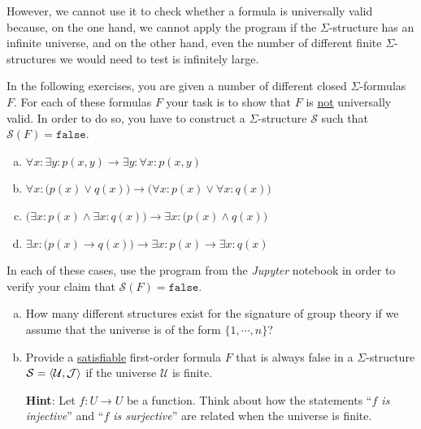 However, we cannot use it to check whether a formula is universally valid because, on the one hand, we cannot apply
the program if the $\Sigma$-structure has an infinite universe, and on the other hand, even the number of
different finite $\Sigma$-structures we would need to test is infinitely large. \eox 

\exerciseEng
In the following exercises, you are given a number of different closed $\Sigma$-formulas $F$. For each of these
formulas $F$ your task is to show that $F$ is \underline{not} universally valid.  In order to do so,
you have to construct a $\Sigma$-structure $\mathcal{S}$ such that $\mathcal{S}(F) = \mathtt{false}$.
\begin{enumerate}[(a)]
\item $\forall x: \exists y: p(x,y) \rightarrow \exists y: \forall x: p(x,y)$
\item $\forall x: \bigl(p(x) \lor q(x)\bigr) \rightarrow \bigl(\forall x: p(x) \lor \forall x: q(x)\bigr)$
\item $\bigl(\exists x: p(x) \land \exists x: q(x)\bigr) \rightarrow \exists x: \bigl(p(x) \land q(x)\bigr)$
\item $\exists x: \bigl(p(x) \rightarrow q(x)\bigr) \rightarrow \exists x: p(x) \rightarrow \exists x: q(x)$
\end{enumerate}
In each of these cases, use the program from the \textsl{Jupyter} notebook
\href{https://github.com/karlstroetmann/Logic/blob/master/TypeScript/Chapter-5/01-FOL-Evaluation.ipynb}{}
in order to verify your claim that $\mathcal{S}(F) = \mathtt{false}$.

\exerciseEng
\begin{enumerate}[(a)]
\item How many different structures exist for the signature of group theory if we assume that the
      universe is of the form $\{1, \cdots, n\}$?
\item Provide a \underline{satisfiable} first-order formula $F$ that is always false in a 
      $\Sigma$-structure $\mathcal{S} = \pair(\mathcal{U},\mathcal{J})$ if  the universe $\mathcal{U}$ is finite.

      \textbf{Hint}: Let $f: U \rightarrow U$ be a function. Think about how the statements
      ``\emph{$f$ is injective}'' and ``\emph{$f$ is surjective}'' are related when the universe is finite.
      \exend  
\end{enumerate}

